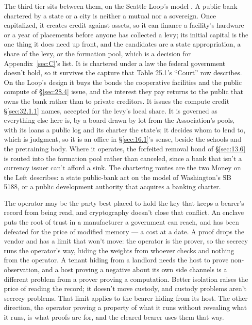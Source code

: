 The third tier sits between them, on the Seattle Loop's model \autocite{suksawat2026seattle,beaman2026prototyping}. A public bank chartered by a state or a city is neither a mutual nor a sovereign. Once capitalized, it creates credit against assets, so it can finance a facility's hardware or a year of placements before anyone has collected a levy; its initial capital is the one thing it does need up front, and the candidates are a state appropriation, a share of the levy, or the formation pool, which is a decision for Appendix~\ref{sec:C}'s list. It is chartered under a law the federal government doesn't hold, so it survives the capture that Table 25.1's “Court” row describes. On the Loop's design it buys the bonds the cooperative facilities and the public compute of \S\ref{sec:28.4} issue, and the interest they pay returns to the public that owns the bank rather than to private creditors. It issues the compute credit \S\ref{sec:32.1.1} names, accepted for the levy's local share. It is governed as everything else here is, by a board drawn by lot from the Association's pools, with its loans a public log and its charter the state's; it decides whom to lend to, which is judgment, so it is an office in \S\ref{sec:16.1}'s sense, beside the schools and the pretraining body. Where it operates, the forfeited removal bond of \S\ref{sec:13.6} is routed into the formation pool rather than canceled, since a bank that isn't a currency issuer can't afford a sink. The chartering routes are the two Money on the Left describes: a state public-bank act on the model of Washington's SB 5188, or a public development authority that acquires a banking charter.


The operator may be the party best placed to hold the key that keeps a bearer's record from being read, and cryptography doesn't close that conflict. An enclave puts the root of trust in a manufacturer a government can reach, and has been defeated for the price of modified memory — a cost at a date. A proof drops the vendor and has a limit that won't move: the operator is the prover, so the secrecy runs the operator's way, hiding the weights from whoever checks and nothing from the operator. A tenant hiding from a landlord needs the host to prove non-observation, and a host proving a negative about its own side channels is a different problem from a prover proving a computation. Better isolation raises the price of reading the record; it doesn't move custody, and custody problems aren't secrecy problems. That limit applies to the bearer hiding from its host. The other direction, the operator proving a property of what it runs without revealing what it runs, is what proofs are for, and the cleared bearer uses them that way.

